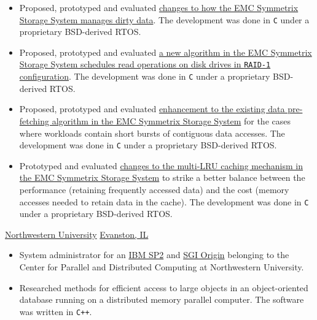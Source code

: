 \documentclass[10pt,a4paper,sans]{moderncv}
\newcommand{\evanston}{\href{https://www.cityofevanston.org/}{Evanston, IL}}
\newcommand{\northwestern}{\href{https://www.northwestern.edu/}{Northwestern University}}
\begin{document}
{
	\begin{itemize}
		\item Proposed, prototyped and evaluated
			\href{https://patentimages.storage.googleapis.com/59/4b/0d/64a4ee1769c704/US7437515.pdf}
			{changes to how the EMC Symmetrix Storage System manages dirty data}.
			The development was done in \texttt{C} under a proprietary BSD-derived RTOS.
		\item Proposed, prototyped and evaluated
			\href{https://patentimages.storage.googleapis.com/e6/95/d6/fda2d287286a2d/US6954833.pdf}
			{a new algorithm in the EMC Symmetrix Storage System schedules read
			operations on disk drives in \texttt{RAID-1} configuration}.
			The development was done in \texttt{C} under a proprietary BSD-derived RTOS.
		\item Proposed, prototyped and evaluated 
			\href{https://patentimages.storage.googleapis.com/c6/ad/4f/ad550b2e923d0d/US6721870.pdf}
			{enhancement to the existing data pre-fetching algorithm
			in the EMC Symmetrix Storage System} for the cases where workloads contain short bursts of
			contiguous data accesses. The development was done in \texttt{C} under a proprietary BSD-derived RTOS.
		\item Prototyped and evaluated
			\href{https://patentimages.storage.googleapis.com/2a/d0/49/84736ddbd4d47b/US6715039.pdf}
			{changes to the multi-LRU caching mechanism in the EMC Symmetrix Storage
			System} to strike a better balance between the performance (retaining
			frequently accessed data) and the cost
			(memory accesses needed to retain data in the cache).
			The development was done in \texttt{C} under a proprietary BSD-derived RTOS.
	\end{itemize}
}
{\northwestern}
{\evanston}
{\begin{itemize}
		\item System administrator for an \href{https://en.wikipedia.org/wiki/IBM_Scalable_POWERparallel}
			{IBM SP2} and \href{https://en.wikipedia.org/wiki/SGI_Origin_2000}
			{SGI Origin} belonging to the
		Center for Parallel and Distributed Computing at Northwestern University.
	\item Researched methods for efficient access to large objects in an object-oriented
		database running on a distributed memory parallel computer. The
		software was written in \texttt{C++}.
	\end{itemize}}
\end{document}
